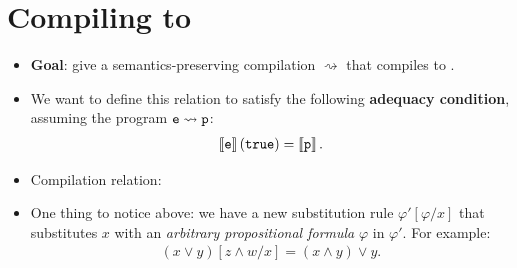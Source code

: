 \documentclass{tufte-handout}
\begin{document}
\section{Compiling \disc{} to \prop{}}
\begin{itemize}
  \item \textbf{Goal}: give a semantics-preserving compilation
  $\rightsquigarrow$ that compiles \disc{} to \prop{}.
  \item We want to define this relation to satisfy the following
  \textbf{adequacy condition}, assuming the program $\texttt{e} \rightsquigarrow \texttt{p}$:
  \begin{align} 
    \left \llbracket {\texttt{e}} \right \rrbracket(\texttt{true}) = \left \llbracket {\texttt{p}} \right \rrbracket.
  \end{align} 
  \item Compilation relation:

  \item One thing to notice above: we have a new substitution rule
  $\varphi'[\varphi/x]$ that substitutes $x$ with an \emph{arbitrary
  propositional formula} $\varphi$ in $\varphi'$. For example:
  \begin{align*}
    (x \lor y)[z \land w/x] = (x \land y) \lor y.
  \end{align*}


\end{itemize}
\end{document}
